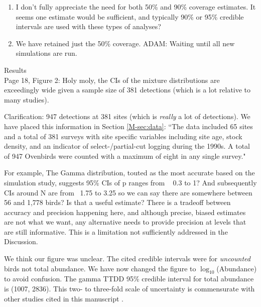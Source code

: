 \documentclass[12pt]{article}
\renewenvironment{quote}  %
              {\list{}{\rightmargin\leftmargin}\normalfont%
               \item\relax}
              {\endlist}
\newcommand{\adam}[1]{{\color{blue} ADAM: #1}}
\begin{document}
\begin{enumerate}
\item I don’t fully appreciate the need for both 50\% and 90\% coverage estimates.  It seems one estimate would be sufficient, and typically 90\% or 95\% credible intervals are used with these types of analyses?
\begin{quote}
We have retained just the 50\% coverage.
\adam{Waiting until all new simulations are run.}
\end{quote}
\end{enumerate}

Results\\
Page 18, Figure 2:  Holy moly, the CIs of the mixture distributions are exceedingly wide given a sample size of 381 detections (which is a lot relative to many studies).
\begin{quote}
Clarification: 947 detections at 381 sites (which is \textit{really} a lot of detections).
We have placed this information in Section \ref{M-sec:data}: ``The data included 65 sites and a total of 381 surveys with site specific variables including site age,  stock density, and an indicator of select-/partial-cut logging during the 1990s. 
A total of 947 Ovenbirds were counted with a maximum of eight in any single survey."
\end{quote}

For example, The Gamma distribution, touted as the most accurate based on the simulation study, suggests 95\% CIs of p ranges from ~ 0.3 to 1?  And subsequently CIs around N are from ~1.75 to 3.25 so we can say there are somewhere between 56 and 1,778  birds?
Is that a useful estimate?  There is a tradeoff between accuracy and precision happening here, and although precise, biased estimates are not what we want, any alternative needs to provide precision at levels that are still informative.  This is a limitation not sufficiently addressed in the Discussion.
\begin{quote} 
We think our figure was unclear.
The cited credible intervals were for \textit{uncounted} birds not total abundance.
We have now changed the figure to $\log_{10}$(Abundance) to avoid confusion.
The gamma TTDD 95\% credible interval for total abundance is (1007, 2836).
This two- to three-fold scale of uncertainty is commensurate with other studies cited in this manuscript \citep{Diefenbach2007, Reidy2011, Solymos2013, Amundson2014}.
\end{quote}
\end{document}
